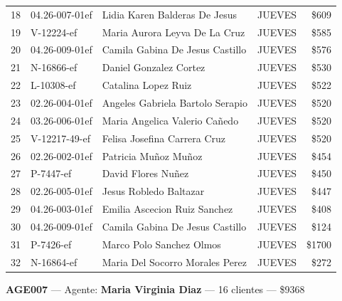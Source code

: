 \documentclass[11pt,a4paper]{article}
\newcommand{\money}[1]{\$\num{#1}}
\begin{document}
\begin{center}
\begin{longtable}{rlp{6.5cm}lr}
18 & 04.26-007-01ef & Lidia Karen Balderas De Jesus & JUEVES & \money{609} \\
19 & V-12224-ef & Maria Aurora Leyva De La Cruz & JUEVES & \money{585} \\
20 & 04.26-009-01ef & Camila Gabina De Jesus Castillo & JUEVES & \money{576} \\
21 & N-16866-ef & Daniel Gonzalez Cortez & JUEVES & \money{530} \\
22 & L-10308-ef & Catalina Lopez Ruiz & JUEVES & \money{522} \\
23 & 02.26-004-01ef & Angeles Gabriela Bartolo Serapio & JUEVES & \money{520} \\
24 & 03.26-006-01ef & Maria Angelica Valerio Cañedo & JUEVES & \money{520} \\
25 & V-12217-49-ef & Felisa Josefina Carrera Cruz & JUEVES & \money{520} \\
26 & 02.26-002-01ef & Patricia Muñoz Muñoz & JUEVES & \money{454} \\
27 & P-7447-ef & David Flores Nuñez & JUEVES & \money{450} \\
28 & 02.26-005-01ef & Jesus Robledo Baltazar & JUEVES & \money{447} \\
29 & 04.26-003-01ef & Emilia Ascecion Ruiz Sanchez & JUEVES & \money{408} \\
30 & 04.26-009-01ef & Camila Gabina De Jesus Castillo & JUEVES & \money{124} \\
31 & P-7426-ef & Marco Polo Sanchez Olmos & JUEVES & \money{1700} \\
32 & N-16864-ef & Maria Del Socorro Morales Perez & JUEVES & \money{272} \\

\bottomrule
\end{longtable}
\end{center}
\noindent\textbf{AGE007} --- Agente: \textbf{Maria Virginia Diaz} --- 16 clientes --- \money{9368}
\end{document}
